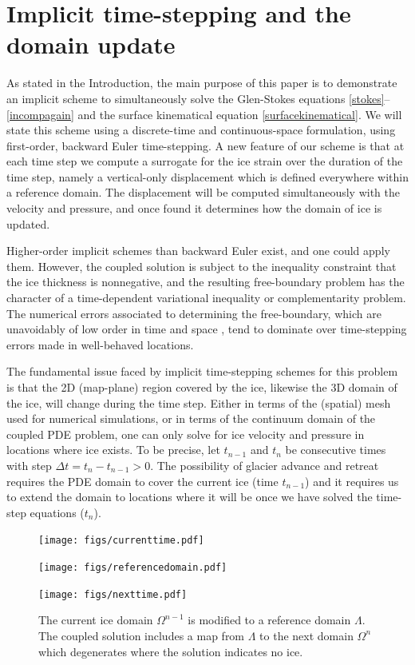 \documentclass[letterpaper,final,12pt,reqno]{amsart}
\begin{document}
\section{Implicit time-stepping and the domain update} \label{sec:implicitstep}

As stated in the Introduction, the main purpose of this paper is to demonstrate an implicit scheme to simultaneously solve the Glen-Stokes equations \eqref{stokes}--\eqref{incompagain} and the surface kinematical equation \eqref{surfacekinematical}.  We will state this scheme using a discrete-time and continuous-space formulation, using first-order, backward Euler time-stepping.  A new feature of our scheme is that at each time step we compute a surrogate for the ice strain over the duration of the time step, namely a vertical-only displacement which is defined everywhere within a reference domain.  The displacement will be computed simultaneously with the velocity and pressure, and once found it determines how the domain of ice is updated.

Higher-order implicit schemes than backward Euler exist, and one could apply them.  However, the coupled solution is subject to the inequality constraint that the ice thickness is nonnegative, and the resulting free-boundary problem has the character of a time-dependent variational inequality \cite{Calvoetal2002} or complementarity \cite{Bueler2016} problem.  The numerical errors associated to determining the free-boundary, which are unavoidably of low order in time and space \cite{Bueler2020}, tend to dominate over time-stepping errors made in well-behaved locations.

The fundamental issue faced by implicit time-stepping schemes for this problem is that the 2D (map-plane) region covered by the ice, likewise the 3D domain of the ice, will change during the time step.  Either in terms of the (spatial) mesh used for numerical simulations, or in terms of the continuum domain of the coupled PDE problem, one can only solve for ice velocity and pressure in locations where ice exists.  To be precise, let $t_{n-1}$ and $t_n$ be consecutive times with step $\Delta t = t_n - t_{n-1} > 0$.  The possibility of glacier advance and retreat requires the PDE domain to cover the current ice (time $t_{n-1}$) and it requires us to extend the domain to locations where it will be once we have solved the time-step equations ($t_n$).

\begin{figure}[ht]
\begin{center}
\texttt{[image: figs/currenttime.pdf]}
\vspace{-6mm}

\texttt{[image: figs/referencedomain.pdf]}
\vspace{-1mm}

\texttt{[image: figs/nexttime.pdf]}
\end{center}
\caption{The current ice domain $\Omega^{n-1}$ is modified to a reference domain $\Lambda$.  The coupled solution includes a map from $\Lambda$ to the next domain $\Omega^n$ which degenerates where the solution indicates no ice.}
\label{fig:domainupdate}
\end{figure}
\end{document}
